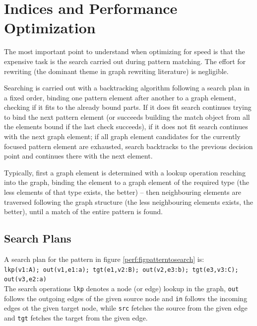 \chapter{Indices and Performance Optimization}\label{sec:performance} 

The most important point to understand when optimizing for speed is that the expensive task is the search carried out during pattern matching. The effort for rewriting (the dominant theme in graph rewriting literature) is negligible.

Searching is carried out with a backtracking algorithm following a search plan in a fixed order, 
binding one pattern element after another to a graph element, checking if it fits to the already bound parts.
If it does fit search continues trying to bind the next pattern element (or succeeds building the match object from all the elements bound if the last check succeeds), if it does not fit search continues with the next graph element; if all graph element candidates for the currently focused pattern element are exhausted, search backtracks to the previous decision point and continues there with the next element.

Typically, first a graph element is determined with a lookup operation reaching into the graph, binding the element to a graph element of the required type (the less elements of that type exists, the better) -- then neighbouring elements are traversed following the graph structure (the less neighbouring elements exists, the better), until a match of the entire pattern is found.


\section{Search Plans}

A search plan for the pattern in figure \ref{perf:figpatterntosearch} is:\\
\texttt{lkp(v1:A); out(v1,e1:a); tgt(e1,v2:B); out(v2,e3:b); tgt(e3,v3:C); out(v3,e2:a)}\\
The search operations \texttt{lkp} denotes a node (or edge) lookup in the graph, \texttt{out} follows the outgoing edges of the given source node and \texttt{in} follows the incoming edges ot the given target node, while \texttt{src} fetches the source from the given edge and \texttt{tgt} fetches the target from the given edge.

